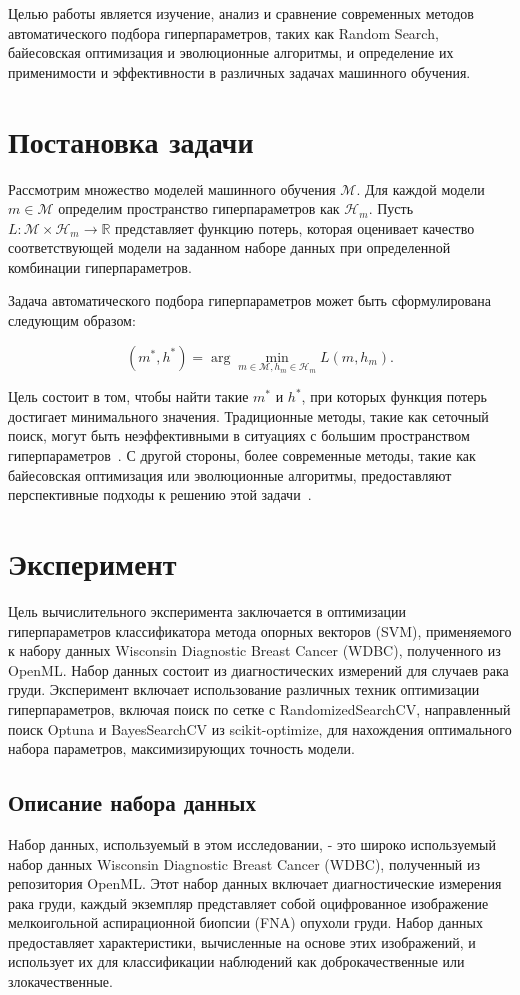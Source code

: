 \documentclass{article}
\begin{document}
Целью работы является изучение, анализ и сравнение современных методов автоматического подбора гиперпараметров, таких как Random Search, байесовская оптимизация и эволюционные алгоритмы, и определение их применимости и эффективности в различных задачах машинного обучения.

\section{Постановка задачи}
Рассмотрим множество моделей машинного обучения \( \mathcal{M} \). Для каждой модели \( m \in \mathcal{M} \) определим пространство гиперпараметров как \( \mathcal{H}_m \). Пусть \( L: \mathcal{M} \times \mathcal{H}_m \rightarrow \mathbb{R} \) представляет функцию потерь, которая оценивает качество соответствующей модели на заданном наборе данных при определенной комбинации гиперпараметров.

Задача автоматического подбора гиперпараметров может быть сформулирована следующим образом:

\[
(m^*, h^*) = \arg\min_{m \in \mathcal{M}, h_m \in \mathcal{H}_m} L(m, h_m).
\]

Цель состоит в том, чтобы найти такие \( m^* \) и \( h^* \), при которых функция потерь достигает минимального значения. Традиционные методы, такие как сеточный поиск, могут быть неэффективными в ситуациях с большим пространством гиперпараметров~\citep{bergstra2012}. С другой стороны, более современные методы, такие как байесовская оптимизация или эволюционные алгоритмы, предоставляют перспективные подходы к решению этой задачи~\citep{snoek2012, thornton2013}.



\section{Эксперимент}
Цель вычислительного эксперимента заключается в оптимизации гиперпараметров классификатора метода опорных векторов (SVM), применяемого к набору данных Wisconsin Diagnostic Breast Cancer (WDBC), полученного из OpenML. Набор данных состоит из диагностических измерений для случаев рака груди. Эксперимент включает использование различных техник оптимизации гиперпараметров, включая поиск по сетке с RandomizedSearchCV, направленный поиск Optuna и BayesSearchCV из scikit-optimize, для нахождения оптимального набора параметров, максимизирующих точность модели.

\subsection{Описание набора данных}
Набор данных, используемый в этом исследовании, - это широко используемый набор данных Wisconsin Diagnostic Breast Cancer (WDBC), полученный из репозитория OpenML. Этот набор данных включает диагностические измерения рака груди, каждый экземпляр представляет собой оцифрованное изображение мелкоигольной аспирационной биопсии (FNA) опухоли груди. Набор данных предоставляет характеристики, вычисленные на основе этих изображений, и использует их для классификации наблюдений как доброкачественные или злокачественные.
\end{document}
